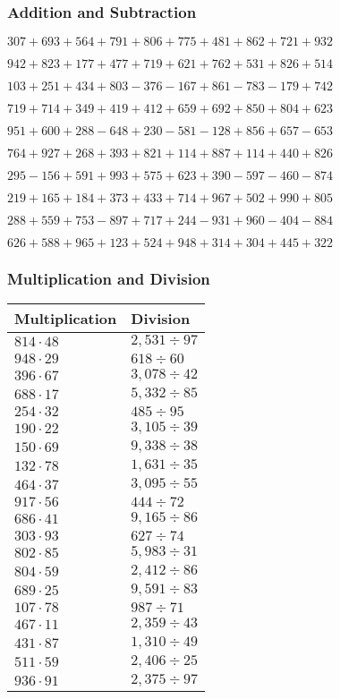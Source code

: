 \hypertarget{addition-and-subtraction-104}{%
\subsubsection{Addition and
Subtraction}\label{addition-and-subtraction-104}}

\(307 + 693 + 564 + 791 + 806 + 775 + 481 + 862 + 721 + 932\)

\(942 + 823 + 177 + 477 + 719 + 621 + 762 + 531 + 826 + 514\)

\(103 + 251 + 434 + 803 - 376 - 167 + 861 - 783 - 179 + 742\)

\(719 + 714 + 349 + 419 + 412 + 659 + 692 + 850 + 804 + 623\)

\(951 + 600 + 288 - 648 + 230 - 581 - 128 + 856 + 657 - 653\)

\(764 + 927 + 268 + 393 + 821 + 114 + 887 + 114 + 440 + 826\)

\(295 - 156 + 591 + 993 + 575 + 623 + 390 - 597 - 460 - 874\)

\(219 + 165 + 184 + 373 + 433 + 714 + 967 + 502 + 990 + 805\)

\(288 + 559 + 753 - 897 + 717 + 244 - 931 + 960 - 404 - 884\)

\(626 + 588 + 965 + 123 + 524 + 948 + 314 + 304 + 445 + 322\)

\hypertarget{multiplication-and-division-104}{%
\subsubsection{Multiplication and
Division}\label{multiplication-and-division-104}}

\begin{longtable}[]{@{}ll@{}}
\toprule
Multiplication & Division\tabularnewline
\midrule
\endhead
\(814 \cdot 48\) & \(2,531÷97\)\tabularnewline
\(948 \cdot 29\) & \(618÷60\)\tabularnewline
\(396 \cdot 67\) & \(3,078÷42\)\tabularnewline
\(688 \cdot 17\) & \(5,332÷85\)\tabularnewline
\(254 \cdot 32\) & \(485÷95\)\tabularnewline
\(190 \cdot 22\) & \(3,105÷39\)\tabularnewline
\(150 \cdot 69\) & \(9,338÷38\)\tabularnewline
\(132 \cdot 78\) & \(1,631÷35\)\tabularnewline
\(464 \cdot 37\) & \(3,095÷55\)\tabularnewline
\(917 \cdot 56\) & \(444÷72\)\tabularnewline
\(686 \cdot 41\) & \(9,165÷86\)\tabularnewline
\(303 \cdot 93\) & \(627÷74\)\tabularnewline
\(802 \cdot 85\) & \(5,983÷31\)\tabularnewline
\(804 \cdot 59\) & \(2,412÷86\)\tabularnewline
\(689 \cdot 25\) & \(9,591÷83\)\tabularnewline
\(107 \cdot 78\) & \(987÷71\)\tabularnewline
\(467 \cdot 11\) & \(2,359÷43\)\tabularnewline
\(431 \cdot 87\) & \(1,310÷49\)\tabularnewline
\(511 \cdot 59\) & \(2,406÷25\)\tabularnewline
\(936 \cdot 91\) & \(2,375÷97\)\tabularnewline
\bottomrule
\end{longtable}

